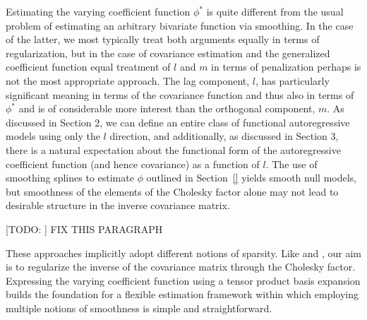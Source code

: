 \documentclass[12pt]{article}
\theoremstyle{definition}
\begin{document}
Estimating the varying coefficient function $\phi^*$ is quite different from the usual problem of estimating an arbitrary bivariate function via smoothing. In the case of the latter, we most typically treat both arguments equally in terms of regularization, but in the case of covariance estimation and the generalized coefficient function equal treatment of $l$ and $m$ in terms of penalization perhaps is not the most appropriate approach. The lag component, $l$, has particularly significant meaning in terms of the covariance function and thus also in terms of $\phi^*$ and is of considerable more interest than the orthogonal component, $m$. As discussed in Section 2, we can define an entire class of functional autoregressive models using only the $l$ direction, and additionally, as discussed in Section 3, there is a natural expectation about the functional form of the autoregressive coefficient function (and hence covariance) as a function of $l$. The use of smoothing splines to estimate $\phi$ outlined in Section~\ref{} yields smooth null models, but smoothness of the elements of the Cholesky factor alone may not lead to desirable structure in the inverse covariance matrix.  

[TODO: ] FIX THIS PARAGRAPH


These approaches implicitly adopt different notions of sparsity. Like \citet{huang2006covariance} and \citet{levina2008sparse}, our aim is to regularize the inverse of the covariance matrix through the Cholesky factor. Expressing the varying coefficient function using a tensor product basis expansion builds the foundation for a flexible estimation framework within which employing multiple notions of smoothness is simple and straightforward. 
\end{document}
